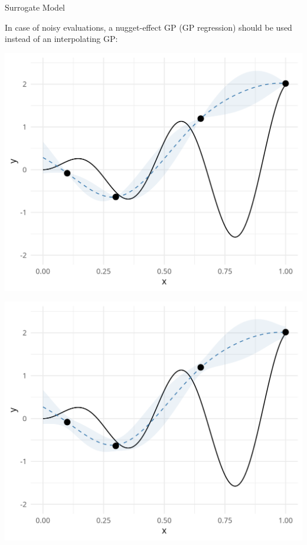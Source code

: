 \documentclass[11pt,compress,t,notes=noshow, xcolor=table]{beamer}
\begin{document}
\begin{vbframe}{Surrogate Model}

In case of noisy evaluations, a nugget-effect GP (GP regression) should be used instead of an interpolating GP:

\vspace{+0.45cm}

\begin{minipage}[b]{0.45\textwidth}
  \includegraphics[width = \textwidth]{figure_man/noisy_1.png}
\end{minipage}
\hfill
\begin{minipage}[b]{0.45\textwidth}
  \includegraphics[width = \textwidth]{figure_man/noisy_2.png}
\end{minipage}

\end{vbframe}
\end{document}
